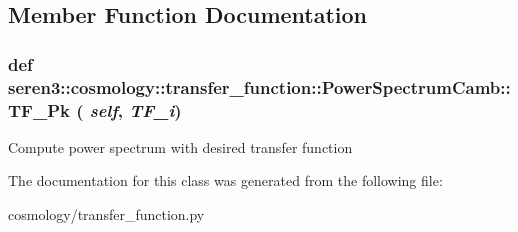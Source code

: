 \subsection{Member Function Documentation}
\hypertarget{classseren3_1_1cosmology_1_1transfer__function_1_1PowerSpectrumCamb_a743a49a9b9d6e14d226973967cc8e3c7}{
\subsubsection[{TF\_\-Pk}]{\setlength{\rightskip}{0pt plus 5cm}def seren3::cosmology::transfer\_\-function::PowerSpectrumCamb::TF\_\-Pk ( {\em self}, \/   {\em TF\_\-i})}}
\label{classseren3_1_1cosmology_1_1transfer__function_1_1PowerSpectrumCamb_a743a49a9b9d6e14d226973967cc8e3c7}
\begin{DoxyVerb}
Compute power spectrum with desired transfer function
\end{DoxyVerb}
 

The documentation for this class was generated from the following file:\begin{DoxyCompactItemize}
\item 
cosmology/transfer\_\-function.py\end{DoxyCompactItemize}
